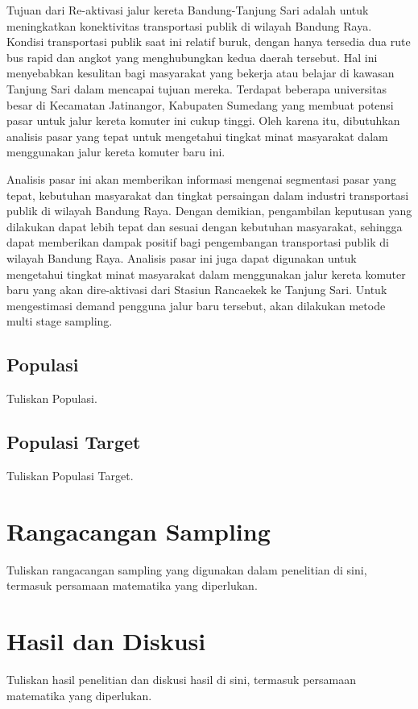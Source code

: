 \documentclass{article}
\begin{document}
Tujuan dari Re-aktivasi jalur kereta Bandung-Tanjung Sari adalah untuk meningkatkan konektivitas transportasi publik di wilayah Bandung Raya. Kondisi transportasi publik saat ini relatif buruk, dengan hanya tersedia dua rute bus rapid dan angkot yang menghubungkan kedua daerah tersebut. Hal ini menyebabkan kesulitan bagi masyarakat yang bekerja atau belajar di kawasan Tanjung Sari dalam mencapai tujuan mereka. Terdapat beberapa universitas besar di Kecamatan Jatinangor, Kabupaten Sumedang yang membuat potensi pasar untuk jalur kereta komuter ini cukup tinggi. Oleh karena itu, dibutuhkan analisis pasar yang tepat untuk mengetahui tingkat minat masyarakat dalam menggunakan jalur kereta komuter baru ini. \par

Analisis pasar ini akan memberikan informasi mengenai segmentasi pasar yang tepat, kebutuhan masyarakat dan tingkat persaingan dalam industri transportasi publik di wilayah Bandung Raya. Dengan demikian, pengambilan keputusan yang dilakukan dapat lebih tepat dan sesuai dengan kebutuhan masyarakat, sehingga dapat memberikan dampak positif bagi pengembangan transportasi publik di wilayah Bandung Raya. Analisis pasar ini juga dapat digunakan untuk mengetahui tingkat minat masyarakat dalam menggunakan jalur kereta komuter baru yang akan dire-aktivasi dari Stasiun Rancaekek ke Tanjung Sari. Untuk mengestimasi demand pengguna jalur baru tersebut, akan dilakukan metode multi stage sampling. \par

\subsection{Populasi}
Tuliskan Populasi.

\subsection{Populasi Target}
Tuliskan Populasi Target.

\section{Rangacangan Sampling}
Tuliskan rangacangan sampling yang digunakan dalam penelitian di sini, termasuk persamaan matematika yang diperlukan.

\section{Hasil dan Diskusi}
Tuliskan hasil penelitian dan diskusi hasil di sini, termasuk persamaan matematika yang diperlukan.

\printbibliography %
\end{document}
